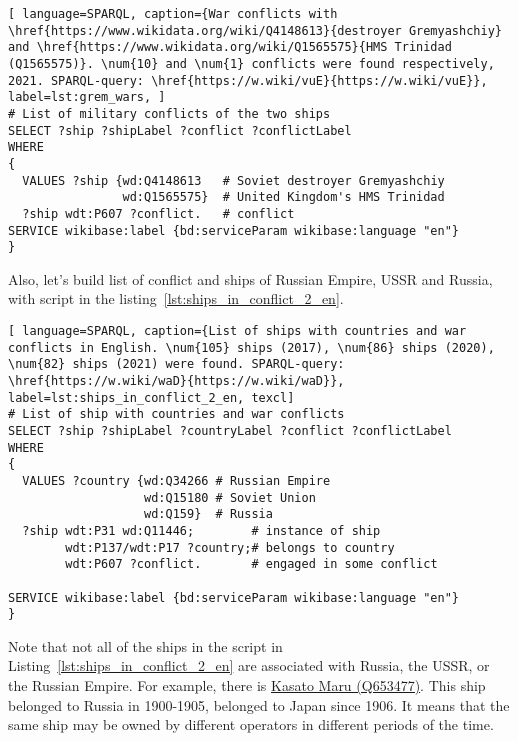\begin{lstlisting}[ language=SPARQL, caption={War conflicts with \href{https://www.wikidata.org/wiki/Q4148613}{destroyer Gremyashchiy} and \href{https://www.wikidata.org/wiki/Q1565575}{HMS Trinidad (Q1565575)}. \num{10} and \num{1} conflicts were found respectively, 2021. SPARQL-query: \href{https://w.wiki/vuE}{https://w.wiki/vuE}}, label=lst:grem_wars, ]
# List of military conflicts of the two ships 
SELECT ?ship ?shipLabel ?conflict ?conflictLabel
WHERE
{
  VALUES ?ship {wd:Q4148613   # Soviet destroyer Gremyashchiy
                wd:Q1565575}  # United Kingdom's HMS Trinidad
  ?ship wdt:P607 ?conflict.   # conflict
SERVICE wikibase:label {bd:serviceParam wikibase:language "en"}
}
\end{lstlisting}

\label{question:ship_3}

Also, let's build list of conflict and ships of Russian Empire, USSR and Russia, with script in the listing~\ref{lst:ships_in_conflict_2_en}.

\begin{lstlisting}[ language=SPARQL, caption={List of ships with countries and war conflicts in English. \num{105} ships (2017), \num{86} ships (2020), \num{82} ships (2021) were found. SPARQL-query: \href{https://w.wiki/waD}{https://w.wiki/waD}}, label=lst:ships_in_conflict_2_en, texcl]
# List of ship with countries and war conflicts
SELECT ?ship ?shipLabel ?countryLabel ?conflict ?conflictLabel
WHERE
{
  VALUES ?country {wd:Q34266 # Russian Empire
                   wd:Q15180 # Soviet Union
                   wd:Q159}  # Russia
  ?ship wdt:P31 wd:Q11446;        # instance of ship
        wdt:P137/wdt:P17 ?country;# belongs to country
        wdt:P607 ?conflict.       # engaged in some conflict

SERVICE wikibase:label {bd:serviceParam wikibase:language "en"}
}
\end{lstlisting}

Note that not all of the ships in the script in Listing~\ref{lst:ships_in_conflict_2_en} are associated with Russia, the USSR, or the Russian Empire. For example, there is \href{https://www.wikidata.org/wiki/Q653477}{Kasato Maru (Q653477)}. This ship belonged to Russia in 1900-1905, belonged to Japan since 1906. It means that the same ship may be owned by different operators in different periods of the time.


